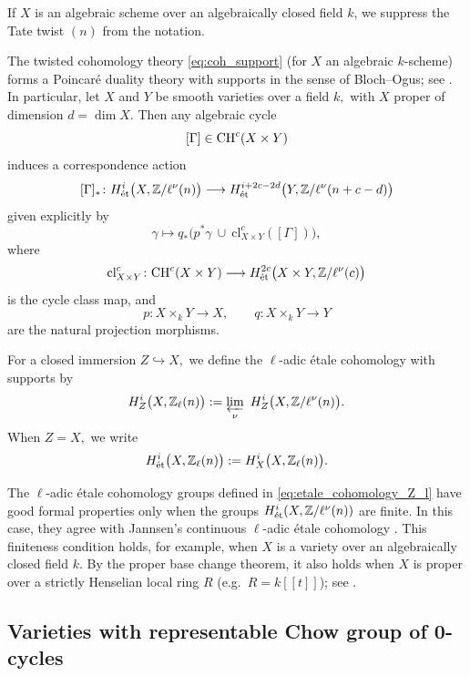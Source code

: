 \documentclass[11pt,letterpaper]{amsart}
\newcommand{\et}{\textnormal{\'et}}
\newcommand{\CH}{\textnormal{CH}}
\numberwithin{equation}{section}
\theoremstyle{definition}
\theoremstyle{remark}
\newcommand{\Z}{\mathbb{Z}}
\newcommand{\cl}{\text{cl}}
\begin{document}
If $X$ is an algebraic scheme over an algebraically closed field $k$, we suppress the Tate twist $(n)$ from the notation. \par

The twisted cohomology theory \eqref{eq:coh_support} (for $X$ an algebraic $k$-scheme) forms a Poincar\'e duality theory with supports in the sense of Bloch--Ogus; see \cite[Definition (1.3), Example (2.1)]{Bloch-Ogus1974}. In particular, let $X$ and $Y$ be smooth varieties over a field $k,$ with $X$ proper of dimension $d=\dim X.$ Then any algebraic cycle $$[\Gamma]\in \CH^{c}(X\times Y)$$ induces a correspondence action 
 \begin{equation}\label{eq:action-correspondences}
     [\Gamma]_{\ast}\colon H^{i}_{\et}\bigl(X,\Z/\ell^{\nu}(n)\bigr)\longrightarrow H^{i+2c-2d}_{\et}\bigl(Y,\Z/\ell^{\nu}(n+c-d)\bigr)
 \end{equation}
 given explicitly by $$ \gamma\longmapsto q_{\ast}\bigl(p^{\ast}\gamma\ \cup\ \cl_{X\times Y}^c([\Gamma])\bigr),$$
where $$\cl^{c}_{X\times Y}\colon \CH^{c}(X\times Y)\longrightarrow H^{2c}_{\et}\bigl(X\times Y,\Z/\ell^{\nu}(c)\bigr)$$ is the cycle class map, and $$p\colon X\times_k Y\longrightarrow X,\qquad q\colon X\times_k Y\longrightarrow Y$$ are the natural projection morphisms.\par
 For a closed immersion $Z\hookrightarrow X,$ we define the $\ell$-adic \'etale cohomology with supports by
\begin{equation}\label{eq:coh_support_Z_l}
    H^{i}_{Z}\bigl(X,\Z_\ell(n)\bigr):= \varprojlim_{\nu}\ H^{i}_{Z}\bigl(X,\Z/\ell^{\nu}(n)\bigr).
\end{equation}
When $Z=X,$ we write
\begin{equation}\label{eq:etale_cohomology_Z_l}
     H^{i}_{\et}\bigl(X,\Z_\ell(n)\bigr):= H^{i}_{X}\bigl(X,\Z_\ell(n)\bigr).
\end{equation}
\par The $\ell$-adic \'etale cohomology groups defined in \eqref{eq:etale_cohomology_Z_l} have good formal properties only when the groups $H_{\et}^i(X,\Z/\ell^\nu(n))$ are finite. In this case, they agree with Jannsen's continuous $\ell$-adic \'etale cohomology \cite{Jannsen1988}. This finiteness condition holds, for example, when $X$ is a variety over an algebraically closed field $k$. By the proper base change theorem, it also holds when $X$ is proper over a strictly Henselian local ring $R$ (e.g.\ $R=k[[t]]$); see \cite[Corollary VI.2.7]{milne_etale}.

\subsection{Varieties with representable Chow group of 0-cycles}\label{subsec:var_repr_Ch}
\end{document}
